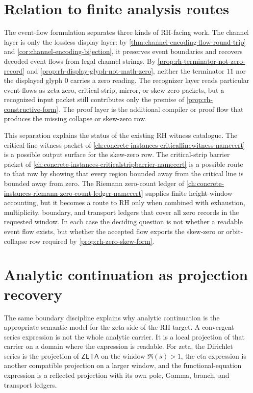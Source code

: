 \section{Relation to finite analysis routes}
\label{sec:rh-eventflow-finite-analysis-routes}

The event-flow formulation separates three kinds of RH-facing work.  The
channel layer is only the lossless display layer: by
\autoref{thm:channel-encoding-flow-round-trip} and
\autoref{cor:channel-encoding-bijection}, it preserves event boundaries and
recovers decoded event flows from legal channel strings.  By
\autoref{prop:rh-terminator-not-zero-record} and
\autoref{prop:rh-display-glyph-not-math-zero}, neither the terminator $11$ nor
the displayed glyph $0$ carries a zero reading.  The recognizer layer reads
particular event flows as zeta-zero, critical-strip, mirror, or skew-zero
packets, but a recognized input packet still contributes only the premise of
\autoref{prop:rh-constructive-form}.  The proof layer is the additional
compiler or proof flow that produces the missing collapse or skew-zero row.

This separation explains the status of the existing RH witness catalogue.
The critical-line witness packet of \autoref{ch:concrete-instances-criticallinewitness-namecert}
is a possible output surface for the skew-zero row.  The critical-strip
barrier packet of \autoref{ch:concrete-instances-criticalstripbarrier-namecert}
is a possible route to that row by showing that every region bounded away from
the critical line is bounded away from zero.  The Riemann zero-count ledger of
\autoref{ch:concrete-instances-riemann-zero-count-ledger-namecert} supplies
finite height-window accounting, but it becomes a route to RH only when
combined with exhaustion, multiplicity, boundary, and transport ledgers that
cover all zero records in the requested window.  In each case the deciding
question is not whether a readable event flow exists, but whether the accepted
flow exports the skew-zero or orbit-collapse row required by
\autoref{prop:rh-zero-skew-form}.

\section{Analytic continuation as projection recovery}
\label{sec:rh-analytic-continuation-projection-recovery}

The same boundary discipline explains why analytic continuation is the
appropriate semantic model for the zeta side of the RH target.  A convergent
series expression is not the whole analytic carrier.  It is a local projection
of that carrier on a domain where the expression is readable.  For zeta, the
Dirichlet series is the projection of $\mathsf{ZETA}$ on the window
$\Re(s)>1$, the eta expression is another compatible projection on a larger
window, and the functional-equation expression is a reflected projection with
its own pole, Gamma, branch, and transport ledgers.

